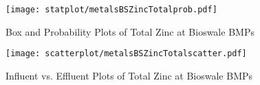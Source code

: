         \begin{figure}[hb]   %
            \centering
            \texttt{[image: statplot/metalsBSZincTotalprob.pdf]}
            \caption{Box and Probability Plots of Total Zinc at Bioswale BMPs}
        \end{figure}         %
        
        
        \begin{figure}[hb]   %
            \centering
            \texttt{[image: scatterplot/metalsBSZincTotalscatter.pdf]}
            \caption{Influent vs. Effluent Plots of Total Zinc at Bioswale BMPs}
        \end{figure}         %
        \clearpage
        